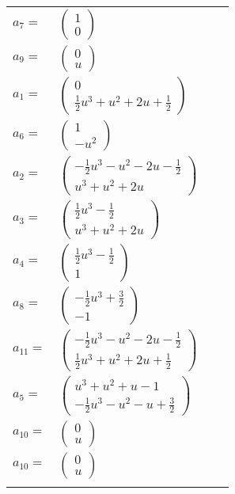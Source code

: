 \documentclass[1p]{elsarticle_modified}
\theoremstyle{definition}
\begin{document}
\begin{tabular}{m{7pt} m{180pt} m{7pt} m{180pt} }
\flushright $a_{7}=$&$\begin{pmatrix}1\\0\end{pmatrix}$ \\
\flushright $a_{9}=$&$\begin{pmatrix}0\\u\end{pmatrix}$ \\
\flushright $a_{1}=$&$\begin{pmatrix}0\\\frac{1}{2} u^3+u^2+2 u+\frac{1}{2}\end{pmatrix}$ \\
\flushright $a_{6}=$&$\begin{pmatrix}1\\- u^2\end{pmatrix}$ \\
\flushright $a_{2}=$&$\begin{pmatrix}-\frac{1}{2} u^3- u^2-2 u-\frac{1}{2}\\u^3+u^2+2 u\end{pmatrix}$ \\
\flushright $a_{3}=$&$\begin{pmatrix}\frac{1}{2} u^3-\frac{1}{2}\\u^3+u^2+2 u\end{pmatrix}$ \\
\flushright $a_{4}=$&$\begin{pmatrix}\frac{1}{2} u^3-\frac{1}{2}\\1\end{pmatrix}$ \\
\flushright $a_{8}=$&$\begin{pmatrix}-\frac{1}{2} u^3+\frac{3}{2}\\-1\end{pmatrix}$ \\
\flushright $a_{11}=$&$\begin{pmatrix}-\frac{1}{2} u^3- u^2-2 u-\frac{1}{2}\\\frac{1}{2} u^3+u^2+2 u+\frac{1}{2}\end{pmatrix}$ \\
\flushright $a_{5}=$&$\begin{pmatrix}u^3+u^2+u-1\\-\frac{1}{2} u^3- u^2- u+\frac{3}{2}\end{pmatrix}$ \\
\flushright $a_{10}=$&$\begin{pmatrix}0\\u\end{pmatrix}$\\ \flushright $a_{10}=$&$\begin{pmatrix}0\\u\end{pmatrix}$\\&\end{tabular}
\end{document}
